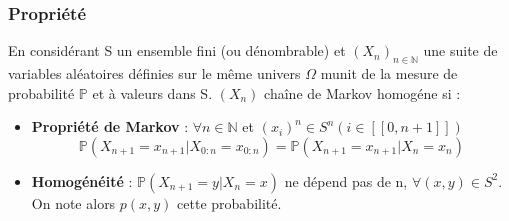 \begin{frame}
    \frametitle{Propriété}

        En considérant S un ensemble fini (ou dénombrable) et $(X_n)_{n \in \mathbb{N}}$ une suite de variables aléatoires définies sur le même univers $\Omega$ munit de la mesure de probabilité $\mathbb{P}$ et à valeurs dans S. $(X_n)$ chaîne de Markov homogéne si :

        \begin{itemize}
            \item \textbf{Propriété de Markov} : $\forall n \in \mathbb{N}$ et $(x_i)^n \in S^n (i \in [[0, n+1]])$ \\
            $$ \mathbb{P}(X_{n+1} = x_{n+1} | X_{0:n} = x_{0:n}) = \mathbb{P}(X_{n+1} = x_{n+1} | X_n = x_n) $$
            \item \textbf{Homogénéité} : $\mathbb{P}(X_{n+1} = y | X_n = x)$ ne dépend pas de n, $\forall (x, y) \in S^2$. On note alors $p(x, y)$ cette probabilité.
        \end{itemize}
\end{frame}

